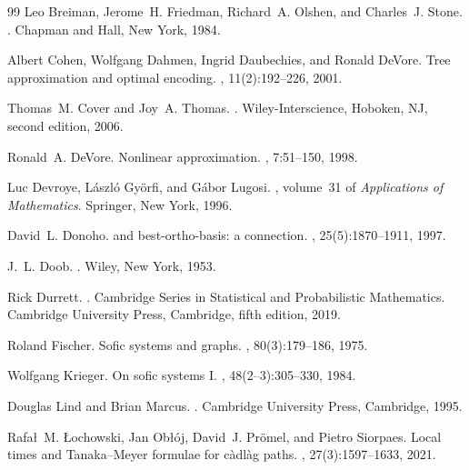 \begin{thebibliography}{99}
Leo Breiman, Jerome~H. Friedman, Richard~A. Olshen, and Charles~J. Stone.
.
\newblock Chapman and Hall, New York, 1984.

Albert Cohen, Wolfgang Dahmen, Ingrid Daubechies, and Ronald DeVore.
\newblock Tree approximation and optimal encoding.
, 11(2):192--226,
  2001.

Thomas~M. Cover and Joy~A. Thomas.
.
\newblock Wiley-Interscience, Hoboken, NJ, second edition, 2006.

Ronald~A. DeVore.
\newblock Nonlinear approximation.
, 7:51--150, 1998.

Luc Devroye, L\'aszl\'o Gy\"orfi, and G\'abor Lugosi.
, volume~31 of
  {\em Applications of Mathematics}.
\newblock Springer, New York, 1996.

David~L. Donoho.
 and best-ortho-basis: a connection.
, 25(5):1870--1911, 1997.

J.~L. Doob.
.
\newblock Wiley, New York, 1953.

Rick Durrett.
.
\newblock Cambridge Series in Statistical and Probabilistic Mathematics.
  Cambridge University Press, Cambridge, fifth edition, 2019.

Roland Fischer.
\newblock Sofic systems and graphs.
, 80(3):179--186, 1975.

Wolfgang Krieger.
\newblock On sofic systems {I}.
, 48(2--3):305--330, 1984.

Douglas Lind and Brian Marcus.
.
\newblock Cambridge University Press, Cambridge, 1995.

Rafa{\l}~M. {\L}ochowski, Jan Ob{\l}\'oj, David~J. Pr\"omel, and Pietro
  Siorpaes.
\newblock Local times and {T}anaka--{M}eyer formulae for c\`adl\`ag paths.
, 27(3):1597--1633, 2021.


\end{thebibliography}
